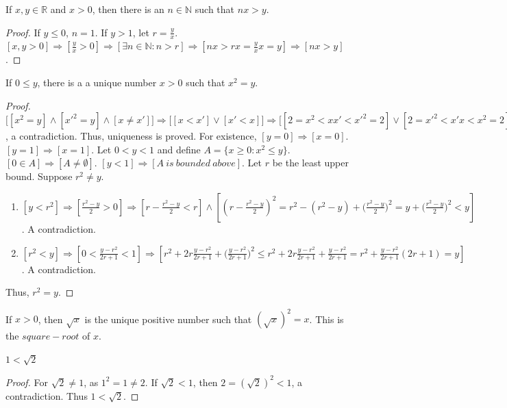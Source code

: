 \documentclass[crop=false,class=book,oneside]{standalone}
\begin{document}
            \begin{corollary}
            If $x,y\in \mathbb{R}$ and $x>0$, then there is an $n\in \mathbb{N}$ such that $nx>y$.
            \end{corollary}
            \begin{proof}
            If $y\leq 0$, $n=1$. If $y>1$, let $r = \frac{y}{x}$. $[x,y>0]\Rightarrow [\frac{y}{x}>0]\Rightarrow [\exists n\in \mathbb{N}:n>r]\Rightarrow [nx > rx = \frac{y}{x}x = y]\Rightarrow[nx>y]$.
            \end{proof}
            \begin{theorem}
            If $0\leq y$, there is a a unique number $x>0$ such that $x^2 = y$.
            \end{theorem}
            \begin{proof}
            $\big[[x^2=y]\land [x'^2=y]\land [x\ne x']\big] \Rightarrow \big[[x<x']\lor[x'<x]\big] \Rightarrow \big[[2=x^2<xx'<x'^2=2]\lor[2=x'^2<x'x<x^2=2]\big]$, a contradiction. Thus, uniqueness is proved. For existence, $[y=0]\Rightarrow[x=0]$.$[y=1]\Rightarrow [x=1]$. Let $0 < y < 1$ and define $A = \{x\geq0:x^2 \leq y\}$. $[0\in A]\Rightarrow[A\ne \emptyset]$. $[y<1]\Rightarrow [A\ is\ bounded\ above]$. Let $r$ be the least upper bound. Suppose $r^2\ne y$.
            \begin{enumerate}
            \item $[y<r^2]\Rightarrow[\frac{r^2-y}{2}>0]\Rightarrow [r-\frac{r^2-y}{2}<r]\land[(r-\frac{r^2-y}{2})^2= r^2 - (r^2-y)+\big(\frac{r^2-y}{2}\big)^2 = y + \big(\frac{r^2-y}{2}\big)^2 < y]$. A contradiction.
            \item $[r^2 <y]\Rightarrow [0<\frac{y-r^2}{2r+1}<1]\Rightarrow [r^2 + 2r\frac{y-r^2}{2r+1}+\big(\frac{y-r^2}{2r+1}\big)^2\leq r^2 + 2r\frac{y-r^2}{2r+1}+\frac{y-r^2}{2r+1} = r^2+\frac{y-r^2}{2r+1}(2r+1)=y]$. A contradiction.
            \end{enumerate}
            Thus, $r^2 = y$.
            \end{proof}
            \begin{definition}
            If $x>0$, then $\sqrt{x}$ is the unique positive number such that $(\sqrt{x})^2 = x$. This is the $square-root$ of $x$.
            \end{definition}
            \begin{corollary}
            $1<\sqrt{2}$
            \end{corollary}
            \begin{proof}
            For $\sqrt{2} \ne 1$, as $1^2 = 1\ne 2$. If $\sqrt{2}<1$, then $2=(\sqrt{2})^2 <1$, a contradiction. Thus $1<\sqrt{2}$.
            \end{proof}
\end{document}
